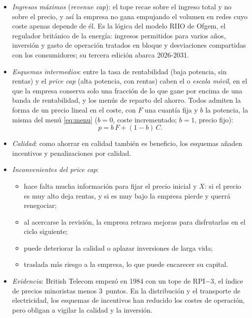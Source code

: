 \documentclass[11pt]{article}
\begin{document}
\begin{itemize}
\item \emph{Ingresos máximos} (\emph{revenue cap}): el tope recae sobre el ingreso total y no sobre el precio, y así la empresa no gana empujando el volumen en redes cuyo coste apenas depende de él. Es la lógica del modelo RIIO de Ofgem, el regulador británico de la energía: ingresos permitidos para varios años, inversión y gasto de operación tratados en bloque y desviaciones compartidas con los consumidores; su tercera edición abarca 2026-2031\nocite{Ofgem2025RIIO3ET}.
\item \emph{Esquemas intermedios}: entre la tasa de rentabilidad (baja potencia, sin rentas) y el \emph{price cap} (alta potencia, con rentas) caben el  o \emph{escala móvil}, en el que la empresa conserva solo una fracción de lo que gane por encima de una banda de rentabilidad, y los menús de reparto del ahorro\nocite{ArmstrongSappington2007Recent}. Todos admiten la forma de un precio lineal en el coste, con $F$ una cuantía fija y $b$ la potencia, la misma del menú \eqref{eq:menu} ($b=0$, coste incrementado; $b=1$, precio fijo):
  \[
  p=b\,F+(1-b)\,C.
  \]
\item \emph{Calidad}: como ahorrar en calidad también es beneficio, los esquemas añaden incentivos y penalizaciones por calidad.
\item \emph{Inconvenientes del \emph{price cap}}:
  \begin{itemize}
  \item hace falta mucha información para fijar el precio inicial y $X$: si el precio es muy alto deja rentas, y si es muy bajo la empresa pierde y querrá renegociar;
  \item al acercarse la revisión, la empresa retrasa mejoras para disfrutarlas en el ciclo siguiente;
  \item puede deteriorar la calidad o aplazar inversiones de larga vida;
  \item traslada más riesgo a la empresa, lo que puede encarecer su capital.
  \end{itemize}
\item \emph{Evidencia}: British Telecom empezó en 1984 con un tope de RPI$-$3, el índice de precios minoristas menos 3~puntos\nocite{ArmstrongCowanVickers1994Regulatory}. En la distribución y el transporte de electricidad, los esquemas de incentivos han reducido los costes de operación, pero obligan a vigilar la calidad y la inversión\nocite{Joskow2014Incentive}.
\end{itemize}
\end{document}
